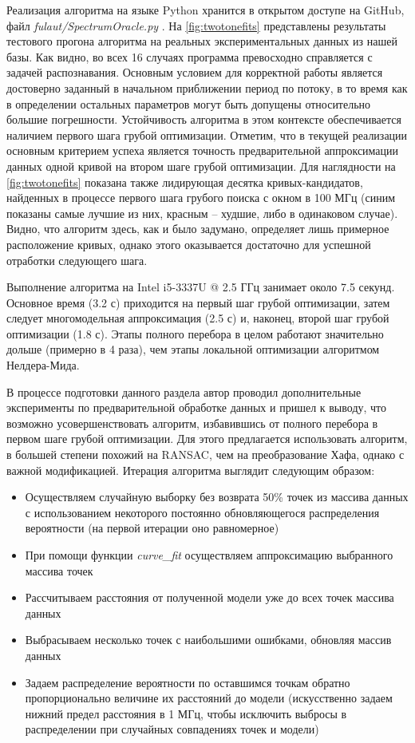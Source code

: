 \documentclass[14pt, a4paper]{extreport}
\numberwithin{equation}{section}
\begin{document}
Реализация алгоритма на языке Python хранится в открытом доступе на GitHub, файл \foreignlanguage{english}{\textit{fulaut/SpectrumOracle.py}} \cite{fedorov2021github}. На \autoref{fig:twotonefits} представлены результаты тестового прогона алгоритма на реальных экспериментальных данных из нашей базы. Как видно, во всех 16 случаях программа превосходно справляется с задачей распознавания. Основным условием для корректной работы является достоверно заданный в начальном приближении период по потоку, в то время как в определении остальных параметров могут быть допущены относительно большие погрешности. Устойчивость алгоритма в этом контексте обеспечивается наличием первого шага грубой оптимизации. Отметим, что в текущей реализации основным критерием успеха является точность предварительной аппроксимации данных одной кривой на втором шаге грубой оптимизации. Для наглядности на \autoref{fig:twotonefits} показана также лидирующая десятка кривых-кандидатов, найденных в процессе первого шага грубого поиска с окном в 100 МГц (синим показаны самые лучшие из них, красным -- худшие, либо в одинаковом случае). Видно, что алгоритм здесь, как и было задумано, определяет лишь примерное расположение кривых, однако этого оказывается достаточно для успешной отработки следующего шага.

Выполнение алгоритма на Intel i5-3337U @ 2.5 ГГц занимает около 7.5 секунд. Основное время (3.2 с) приходится на первый шаг грубой оптимизации, затем следует многомодельная аппроксимация (2.5 с) и, наконец, второй шаг грубой оптимизации (1.8 с). Этапы полного перебора в целом работают значительно дольше (примерно в 4 раза), чем этапы локальной оптимизации алгоритмом Нелдера-Мида.

В процессе подготовки данного раздела автор проводил дополнительные эксперименты по предварительной обработке данных и пришел к выводу, что возможно усовершенствовать алгоритм, избавившись от полного перебора в первом шаге грубой оптимизации. Для этого предлагается использовать алгоритм, в большей степени похожий на RANSAC, чем на преобразование Хафа, однако с важной модификацией. Итерация алгоритма выглядит следующим образом:
\begin{itemize}
	\item Осуществляем случайную выборку без возврата 50\% точек из массива данных с использованием некоторого постоянно обновляющегося распределения вероятности (на первой итерации оно равномерное)
	\item При помощи функции \foreignlanguage{english}{\textit{curve_fit}} осуществляем аппроксимацию выбранного массива точек
	\item Рассчитываем расстояния от полученной модели уже до всех точек массива данных
	\item Выбрасываем несколько точек с наибольшими ошибками, обновляя массив данных
	\item Задаем распределение вероятности по оставшимся точкам обратно пропорционально величине их расстояний до модели (искусственно задаем нижний предел расстояния в 1 МГц, чтобы исключить выбросы в распределении при случайных совпадениях точек и модели)
\end{itemize}
\end{document}
